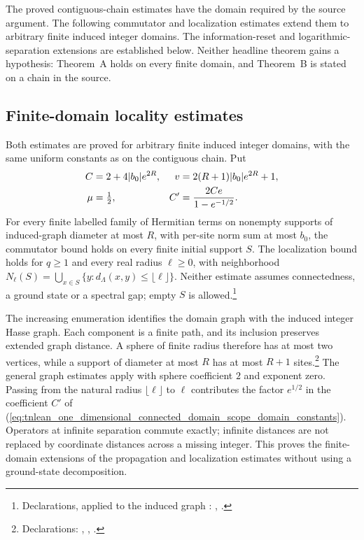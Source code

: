 \documentclass{article}
\begin{document}
The proved contiguous-chain estimates have the domain required by the source
argument. The following commutator and localization estimates extend them to
arbitrary finite induced integer domains. The information-reset and
logarithmic-separation extensions are established below. Neither headline
theorem gains a hypothesis: Theorem~A holds on every finite domain, and
Theorem~B is stated on a chain in the source.

\subsection{Finite-domain locality estimates}

Both estimates are proved for arbitrary finite induced integer domains,
with the same uniform constants as on the contiguous chain. Put
\begin{align}
    C   & = 2+4|b_0|e^{2R}, & v  & = 2(R+1)|b_0|e^{2R}+1, \notag \\
    \mu & = \tfrac12,       & C' & = \frac{2Ce}{1-e^{-1/2}}.
    \label{eq:tnlean_one_dimensional_connected_domain_scope_domain_constants}
\end{align}
For every finite labelled family of Hermitian terms on nonempty supports
of induced-graph diameter at most $R$, with per-site norm sum at most $b_0$,
the commutator bound holds on every finite initial support $S$. The
localization bound holds for $q\ge1$ and every real radius $\ell\ge0$, with
neighborhood
$N_\ell(S)=\bigcup_{x\in S}\{y:d_\Lambda(x,y)\le\lfloor\ell\rfloor\}$.
Neither estimate assumes connectedness, a ground state or a spectral gap;
empty $S$ is allowed.\footnote{Declarations, applied to the induced graph
    :
    ,
    .}

The increasing enumeration identifies the domain graph with the induced
integer Hasse graph. Each component is a finite path, and its inclusion
preserves extended graph distance. A sphere of finite radius therefore has
at most two vertices, while a support of diameter at most $R$ has at most
$R+1$ sites.\footnote{Declarations:
    ,
    ,
    .}
The general graph estimates apply with sphere coefficient $2$ and exponent
zero. Passing from the natural radius $\lfloor\ell\rfloor$ to $\ell$
contributes the factor $e^{1/2}$ in the coefficient $C'$ of
(\ref{eq:tnlean_one_dimensional_connected_domain_scope_domain_constants}). Operators at
infinite separation commute exactly; infinite distances are not replaced
by coordinate distances across a missing integer. This proves the finite-domain extensions of the propagation and localization
estimates without using a ground-state decomposition.
\end{document}
